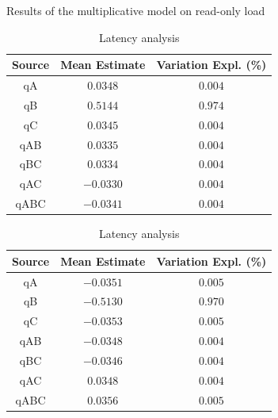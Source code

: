 \documentclass[11pt,a4paper]{article}
\begin{document}
\begin{table}[h!]
\centering
\small
{Results of the multiplicative model on read-only load}
\begin{minipage}{.5\textwidth}
\centering
	\begin{tabular}{|c|c|c|}
	\hline 
	{\small Source} & {\small Mean Estimate} & {\small Variation Expl. (\%)} \\ 
	\hline 
	qA & $0.0348$ & $0.004$ \\ 
	\hline 
	qB & $0.5144$ & $0.974$ \\ 
	\hline 
	qC & $0.0345$ & $0.004$ \\ 
	\hline 
	qAB & $0.0335$ & $0.004$ \\ 
	\hline 
	qBC & $0.0334$ & $0.004$ \\ 
	\hline 
	qAC & $-0.0330$ & $0.004$ \\ 
	\hline 
	qABC & $-0.0341$ & $0.004$ \\ 
	\hline 
	\end{tabular} \caption{Throughput analysis} \label{tab:2k-mult-ro-tpt}
\end{minipage}%
\begin{minipage}{.5\textwidth}
\centering
	\begin{tabular}{|c|c|c|}
	\hline 
	{\small Source} & {\small Mean Estimate} & {\small Variation Expl. (\%)} \\ 
	\hline 
	qA & $-0.0351$ & $0.005$ \\ 
	\hline 
	qB & $-0.5130$ & $0.970$ \\ 
	\hline 
	qC & $-0.0353$ & $0.005$ \\ 
	\hline 
	qAB & $-0.0348$ & $0.004$ \\ 
	\hline 
	qBC & $-0.0346$ & $0.004$ \\ 
	\hline 
	qAC & $0.0348$ & $0.004$ \\ 
	\hline 
	qABC & $0.0356$ & $0.005$ \\ 
	\hline 
	\end{tabular} \caption{Latency analysis} \label{tab:2k-mult-ro-lat}
\end{minipage}
\end{table}\label{tab:2k-mult-ro}
\end{document}
